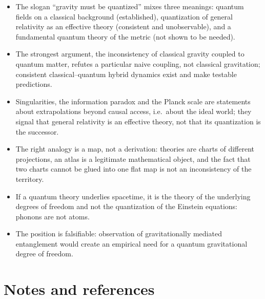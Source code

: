 \begin{itemize}
\item The slogan ``gravity must be quantized'' mixes three meanings:
  quantum fields on a classical background (established), quantization of
  general relativity as an effective theory (consistent and unobservable),
  and a fundamental quantum theory of the metric (not shown to be needed).
\item The strongest argument, the inconsistency of classical gravity
  coupled to quantum matter, refutes a particular naive coupling, not
  classical gravitation; consistent classical--quantum hybrid dynamics
  exist and make testable predictions.
\item Singularities, the information paradox and the Planck scale are
  statements about extrapolations beyond causal access, i.e.\ about the
  ideal world; they signal that general relativity is an effective theory,
  not that its quantization is the successor.
\item The right analogy is a map, not a derivation: theories are
  charts of different projections, an atlas is a legitimate mathematical
  object, and the fact that two charts cannot be glued into one flat map
  is not an inconsistency of the territory.
\item If a quantum theory underlies spacetime, it is the theory of the
  underlying degrees of freedom and not the quantization of the Einstein
  equations: phonons are not atoms.
\item The position is falsifiable: observation of gravitationally mediated
  entanglement would create an empirical need for a quantum gravitational
  degree of freedom.
\end{itemize}

\section*{Notes and references}

